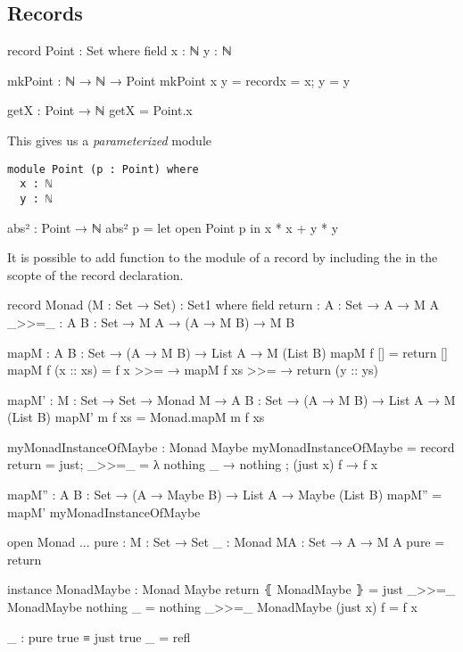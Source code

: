 \subsection{Records}
\begin{code}
record Point : Set where
  field x : ℕ
        y : ℕ

mkPoint : ℕ → ℕ → Point
mkPoint x y = record{x = x; y = y}

getX : Point → ℕ
getX = Point.x
\end{code}

This gives us a \emph{parameterized} module
\begin{verbatim}
module Point (p : Point) where
  x : ℕ
  y : ℕ
\end{verbatim}

\begin{code}
abs² : Point → ℕ
abs² p = let open Point p in x * x + y * y
\end{code}

It is possible to add function to the module of a record by
including the in the scopte of the record declaration.

\begin{code}
record Monad (M : Set → Set) : Set1 where
  field
    return : {A : Set} → A → M A
    _>>=_ : {A B : Set} → M A → (A → M B) → M B

  mapM : {A B : Set} → (A → M B) → List A → M (List B)
  mapM f [] = return []
  mapM f (x :: xs) = f x >>= \y →
                     mapM f xs >>= \ys →
                     return (y :: ys)

mapM' : {M : Set → Set} → Monad M →
        {A B : Set} → (A → M B) → List A → M (List B)
mapM' m f xs = Monad.mapM m f xs

myMonadInstanceOfMaybe : Monad Maybe
myMonadInstanceOfMaybe = record {
    return = just;
    _>>=_ = λ { nothing _ → nothing  ; (just x) f → f x }
  }

mapM'' : {A B : Set} → (A → Maybe B) → List A → Maybe (List B)
mapM'' = mapM' myMonadInstanceOfMaybe

open Monad {{...}}
pure : {M : Set → Set} {{_ : Monad M}}{A : Set} → A → M A
pure = return

instance
  MonadMaybe : Monad Maybe
  return ⦃ MonadMaybe ⦄ = just
  _>>=_  {{ MonadMaybe }} nothing _ = nothing
  _>>=_  {{ MonadMaybe }} (just x) f = f x


_ : pure true ≡ just true
_ = refl

\end{code}

